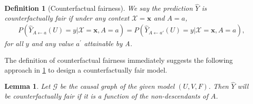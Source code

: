 \documentclass{article}
\newtheorem{lemma}[theorem]{Lemma}
\newtheorem{definition}[theorem]{Definition}
\begin{document}

\begin{definition}[Counterfactual fairness] \citep[Definition 5]{kusner2017counterfactual} \label{def: counterfactual fairness}
    We say the prediction $\hat{Y}$ is counterfactually fair if under any context $\mathcal{X} =\mathbf{x}$ and $A=a$,
    \begin{align}\label{eq: counterfactual fairness}
        &P(\hat{Y}_{A \gets a}(U)=y|\mathcal{X}=\mathbf{x},A=a)
        =P(\hat{Y}_{A\gets{a'}}(U)=y|\mathcal{X}=\mathbf{x},A=a),    \nonumber
    \end{align}
    for all $y$ and any value $a^{\prime}$ attainable by A.
\end{definition}


The definition of counterfactual fairness immediately suggests the following approach in \cref{lem: counterfactual fairness implication} to design a counterfactually fair model. 

\begin{lemma}\citep[Lemma 1]{kusner2017counterfactual}\label{lem: counterfactual fairness implication}
    Let $\mathcal{G}$ be the causal graph of the given model $(U,V,F)$. Then $\hat{Y}$ will be counterfactually fair if it is a function of the non-descendants of $A$.
\end{lemma}


\end{document}
